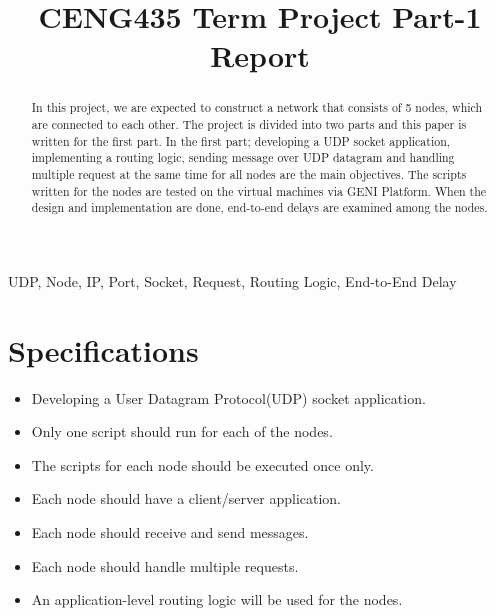 \documentclass[conference]{IEEEtran}
\begin{document}
\title{CENG435 Term Project Part-1 Report\\}

\author{
\and
{}
}

\maketitle

\begin{abstract}
In this project, we are expected to construct a network that consists of 5 nodes, which are connected to each other. The project is divided into two parts and this paper is written for the first part. In the first part; developing a UDP socket application, implementing a routing logic, sending message over UDP datagram and handling multiple request at the same time for all nodes are the main objectives. The scripts written for the nodes are tested on the virtual machines via GENI Platform. When the design and implementation are done, end-to-end delays are examined among the nodes. 
\end{abstract}

\begin{IEEEkeywords}
UDP, Node, IP, Port, Socket, Request, Routing Logic, End-to-End Delay
\end{IEEEkeywords}

\section{Specifications}
\begin{itemize}
    \item Developing a User Datagram Protocol(UDP) socket application.
    \item Only one script should run for each of the nodes.
    \item The scripts for each node should be executed once only.
    \item Each node should have a client/server application.
    \item Each node should receive and send messages.
    \item Each node should handle multiple requests. 
    \item An application-level routing logic will be used for the nodes.
\end{itemize}
\end{document}
